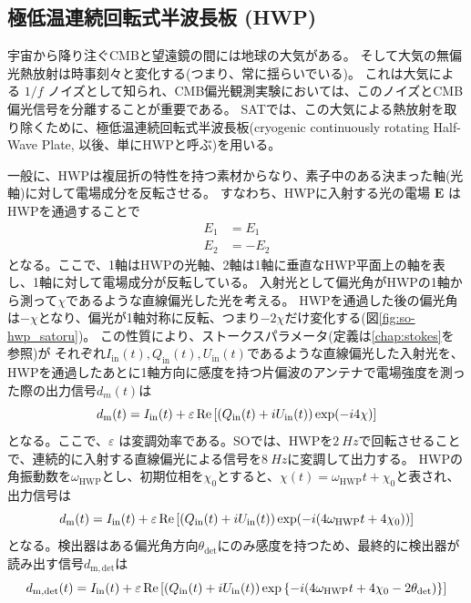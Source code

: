 \documentclass[../../main.tex]{subfiles}
\begin{document}
\subsection{極低温連続回転式半波長板 (HWP)}
\label{sec:HWP}
宇宙から降り注ぐCMBと望遠鏡の間には地球の大気がある。
そして大気の無偏光熱放射は時事刻々と変化する(つまり、常に揺らいでいる)。
これは大気による $1/f$ ノイズとして知られ、CMB偏光観測実験においては、このノイズとCMB偏光信号を分離することが重要である。
SATでは、この大気による熱放射を取り除くために、極低温連続回転式半波長板(cryogenic continuously rotating Half-Wave Plate, 以後、単にHWPと呼ぶ)を用いる。\cite{so:hwp_yamada}

一般に、HWPは複屈折の特性を持つ素材からなり、素子中のある決まった軸(光軸)に対して電場成分を反転させる。
すなわち、HWPに入射する光の電場 $\bm{E}$ はHWPを通過することで
\begin{align}
    E_{1} &= E_{1} \\
    E_{2} &= -E_{2}
\end{align}
となる。ここで、1軸はHWPの光軸、2軸は1軸に垂直なHWP平面上の軸を表し、1軸に対して電場成分が反転している。
入射光として偏光角がHWPの1軸から測って$\chi$であるような直線偏光した光を考える。
HWPを通過した後の偏光角は$-\chi$となり、偏光が1軸対称に反転、つまり$-2\chi$だけ変化する(図\ref{fig:so-hwp_satoru})。
この性質により、ストークスパラメータ(定義は\ref{chap:stokes}を参照)が
それぞれ$I_{\mathrm{in}}(t), Q_{\mathrm{in}}(t), U_{\mathrm{in}}(t)$であるような直線偏光した入射光を、
HWPを通過したあとに1軸方向に感度を持つ片偏波のアンテナで電場強度を測った際の出力信号$d_m(t)$は
\begin{equation}
    d_{\mathrm{m}}(t) = I_{\mathrm{in}}(t) + \varepsilon\Re\qty[\qty(Q_{\mathrm{in}}(t)+iU_{\mathrm{in}}(t))\exp(-i 4\chi)]
\end{equation}
となる。ここで、$\varepsilon$ は変調効率である。SOでは、HWPを$\SI{2}{Hz}$で回転させることで、連続的に入射する直線偏光による信号を$\SI{8}{Hz}$に変調して出力する。
HWPの角振動数を$\omega_{\mathrm{HWP}}$とし、初期位相を$\chi_0$とすると、$\chi(t) = \omega_{\mathrm{HWP}}t + \chi_{0}$と表され、出力信号は
\begin{equation}
    d_{\mathrm{m}}(t) = I_{\mathrm{in}}(t) + \varepsilon\Re\qty[\qty(Q_{\mathrm{in}}(t)+iU_{\mathrm{in}}(t))\exp(-i \qty(4\omega_{\mathrm{HWP}}t + 4\chi_0))]
\end{equation}
となる。検出器はある偏光角方向$\theta_{\mathrm{det}}$にのみ感度を持つため、最終的に検出器が読み出す信号$d_{\mathrm{m}, \mathrm{det}}$は
\begin{equation}
    \label{eq:so-hwp_modulation}
    d_{\mathrm{m}, \mathrm{det}}(t) = I_{\mathrm{in}}(t) + \varepsilon\Re\qty[\qty(Q_{\mathrm{in}}(t)+iU_{\mathrm{in}}(t))\exp\qty{-i \qty(4\omega_{\mathrm{HWP}}t + 4\chi_0 - 2\theta_{\mathrm{det}})}]
\end{equation}
\end{document}
